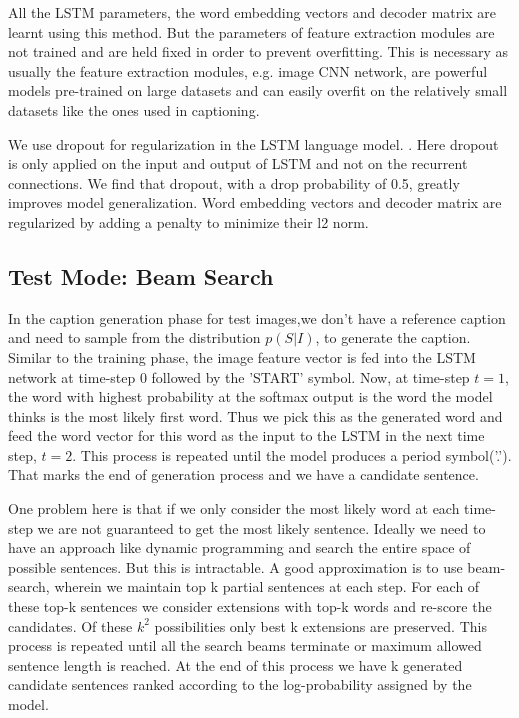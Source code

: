 All the LSTM parameters, the word embedding vectors and decoder matrix are
learnt using this method.
But the parameters of feature extraction modules are not trained and are held
fixed in order to prevent overfitting. 
This is necessary as usually the feature extraction modules, e.g. image CNN
network, are powerful models pre-trained on large datasets and can easily
overfit on the relatively small datasets like the ones used in captioning.

We use dropout for regularization in the LSTM language model.
\cite{ZarembaSV14}.
Here dropout is only applied on the input and output of LSTM and not on
the recurrent connections.
We find that dropout, with a drop probability of 0.5, greatly improves model
generalization.
Word embedding vectors and decoder matrix are regularized by adding a penalty to
minimize their l2 norm.

\subsection{Test Mode: Beam Search}
In the caption generation phase for test images,we don't have a reference
caption and need to sample from the distribution $p(S|I)$, to generate the
caption.
Similar to the training phase, the image feature vector is fed into the LSTM
network at time-step 0 followed by the 'START' symbol.
Now, at time-step $t=1$, the word with highest probability at the softmax output
is the word the model thinks is the most likely first word.
Thus we pick this as the generated word and feed the word vector for this word
as the input to the LSTM in the next time step, $t=2$.
This process is repeated until the model produces a period symbol('.').
That marks the end of generation process and we have a candidate sentence.

One problem here is that if we only consider the most likely word at each
time-step we are not guaranteed to get the most likely sentence.
Ideally we need to have an approach like dynamic programming and search the
entire space  of possible sentences.
But this is intractable.
A good approximation is to use beam-search, wherein we maintain top k partial
sentences at each step.
For each of these top-k sentences we consider extensions with top-k words and
re-score the candidates.
Of these $k^2$ possibilities only best k extensions are preserved.
This process is repeated until all the search beams terminate or maximum allowed
sentence length is reached.
At the end of this process we have k generated candidate sentences ranked
according to the log-probability assigned by the model.

